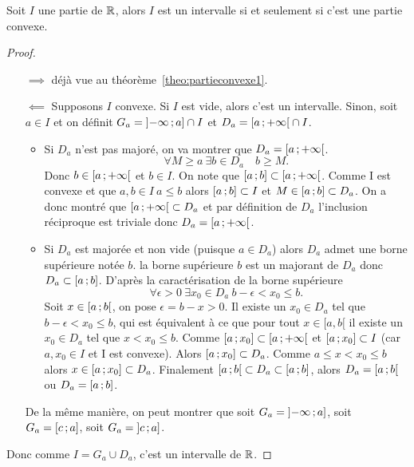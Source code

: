 \begin{theo}
  Soit $I$ une partie de $\mathbb{R}$, alors $I$ est un intervalle si et seulement si c'est une partie convexe.
\end{theo}
\begin{proof}
  \begin{itemize}
  \item[$\implies$] déjà vue au théorème~\ref{theo:partieconvexe1}.
  \item[$\impliedby$] Supposons $I$ convexe. Si $I$ est vide, alors c'est un intervalle. Sinon, soit $a\in I$ et on définit $G_a=\left] -\infty \, ;  a \right]\cap I$ et $D_a=\left[ a \, ;  +\infty \right[\cap I$.
    \begin{itemize}
    \item Si $D_a$ n'est pas majoré, on va montrer que $D_a=\left[ a \, ;  +\infty \right[$.
      \begin{equation}
        \forall M \geqslant a \ \exists b \in D_a \quad b\geqslant M.
      \end{equation}
      Donc $b\in \left[ a \, ;  +\infty \right[$ et $b\in I$. On note que $\left[ a \, ;  b \right]\subset \left[ a \, ;  +\infty \right[$. Comme I est convexe et que $a,b \in I \ a \leqslant b$ alors $\left[ a \, ;  b \right]\subset I$ et $M\in \left[ a \, ;  b \right] \subset D_a$. On a donc montré que $\left[ a \, ;  +\infty \right[ \subset D_a$ et par définition de $D_a$ l'inclusion réciproque est triviale donc $D_a=\left[ a \, ;  +\infty \right[$.
    \item Si $D_a$ est majorée et non vide (puisque $a\in D_a$) alors $D_a$ admet une borne supérieure notée $b$. la borne supérieure $b$ est un majorant de $D_a$ donc $D_a \subset \left[ a \, ;  b \right]$. D'après la caractérisation de la borne supérieure
      \begin{equation}
        \forall \epsilon >0 \ \exists x_0 \in D_a \ b-\epsilon < x_0\leqslant b.
      \end{equation}
      Soit $x\in \left[ a \, ;  b \right[$, on pose $\epsilon=b-x>0$. Il existe un $x_0\in D_a$ tel que $b-\epsilon<x_0 \leqslant b$, qui est équivalent à ce que pour tout $x\in[a,b[$ il existe un $x_0\in D_a$ tel que $x<x_0 \leqslant b$. Comme $\left[ a \, ;  x_0 \right]\subset \left[ a \, ;  +\infty \right[$ et $\left[ a \, ;  x_0 \right]\subset I$ (car $a,x_0 \in I$ et I est convexe). Alors $\left[ a \, ;  x_0 \right] \subset D_a$. Comme $a\leqslant x < x_0\leqslant b$ alors $x\in \left[ a \, ;  x_0 \right]\subset D_a$. Finalement $\left[ a \, ;  b \right[\subset D_a \subset \left[ a \, ;  b \right]$, alors $D_a=\left[ a \, ;  b \right[$ ou $D_a=\left[ a \, ;  b \right]$.
    \end{itemize}
    De la même manière, on peut montrer que soit $G_a=\left] -\infty \, ;  a \right]$, soit $G_a=\left[ c \, ;  a \right]$, soit $G_a=\left] c \, ;  a \right]$.
  \end{itemize}
  Donc comme $I=G_a\cup D_a$, c'est un intervalle de $\mathbb{R}$.
\end{proof}

